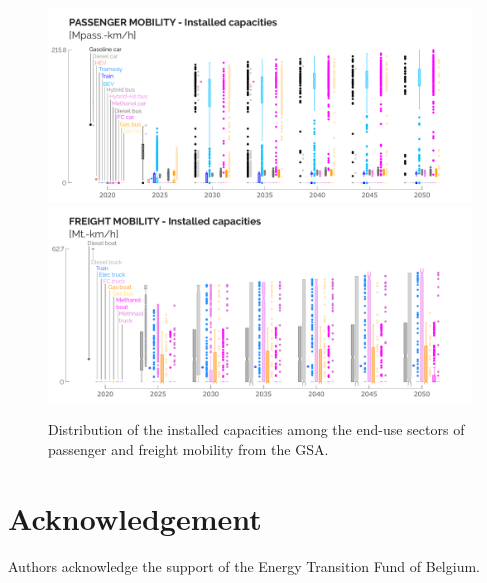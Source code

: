 \documentclass[11pt,twoside,a4paper,english]{article}
\begin{document}
\begin{appendices}
\begin{figure}[htbp!]
\centering
\includegraphics[width=\textwidth]{PASS_MOB_Tech.pdf}
\includegraphics[width=\textwidth]{FREIGHT_MOB_Tech.pdf}
\caption{Distribution of the installed capacities among the end-use sectors of passenger and freight mobility from the \acrfull{GSA}.}
\label{fig:results_uq_tech_cap_MOB}
\end{figure}


\end{appendices}


\newpage

\section*{Acknowledgement}
Authors acknowledge the support of the Energy Transition Fund of Belgium.

% 
\printbibliography[heading=bibintoc]
\end{document}
